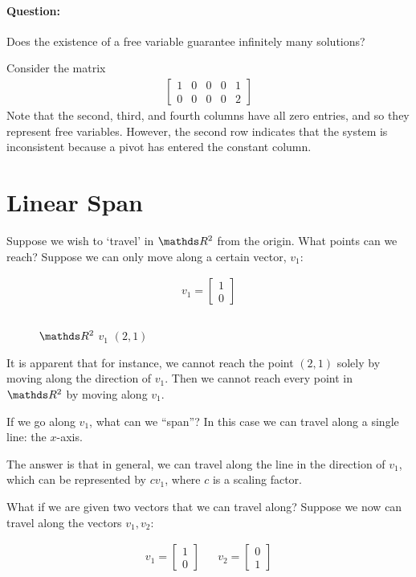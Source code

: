 \documentclass[11pt]{article}
\newcommand{\ques}{\paragraph{Question:}}
\begin{document}
\ques
Does the existence of a free variable guarantee infinitely many solutions?

Consider the matrix
\begin{align*}
\left[
\begin{matrix}
1 & 0 & 0 & 0 & 1
\\
0 & 0 & 0 & 0 & 2
\end{matrix}
\right]
\end{align*}
Note that the second, third, and fourth columns have all zero entries, and so they represent free variables. However, the second row indicates that the system is inconsistent because a pivot has entered the constant column.


\section*{Linear Span}

Suppose we wish to `travel' in $\bbR^2$ from the origin. What points can we reach? Suppose we can only move along a certain vector, $v_1$:

\begin{figure}[H]
\centering
\begin{align*}
v_1 = \begin{bmatrix}1\\0\end{bmatrix}
\\
\\
\end{align*}
\end{figure}

\begin{figure}[b]
$\bbR^2$
$v_1$
$(2,1)$
\end{figure}

It is apparent that for instance, we cannot reach the point $(2,1)$ solely by moving along the direction of $v_1$. Then we cannot reach every point in $\bbR^2$ by moving along $v_1$.

If we go along $v_1$, what can we ``span''? In this case we can travel along a single line: the $x$-axis.

The answer is that in general, we can travel along the line in the direction of $v_1$, which can be represented by $c v_1$, where $c$ is a scaling factor.


What if we are given two vectors that we can travel along? Suppose we now can travel along the vectors $v_1, v_2$:
\begin{figure}[H]
\centering
\begin{align*}
v_1 = \begin{bmatrix}1\\0\end{bmatrix}
&&
v_2 = \begin{bmatrix}0\\1\end{bmatrix}
\\
\end{align*}
\end{figure}
\end{document}
